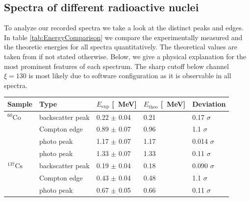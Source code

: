 \subsection{Spectra of different radioactive nuclei}
%
To analyze our recorded spectra we take a look at the distinct peaks and edges.
In table \ref{tab:EnergyComparison} we compare the experimentally measured and the theoretic energies for all spectra quantitatively.
The theoretical values are taken from \cite{Anleitung} if not stated otherwise.
Below, we give a physical explanation for the most prominent features of each spectrum.
The sharp cutoff below channel $\xi = 130$ is most likely due to software configuration as it is observable in all spectra.
%
\par
%
\minipage{\linewidth}
    \begin{center}
        \captionsetup{type=table}
        \begin{adjustbox}{max width=\linewidth, keepaspectratio}
            \begin{tabular}{lllll}
            \toprule
            Sample            & Type             & $E_{\text{exp}}$ [\SI{}{\mega\electronvolt}] & $E_{\text{theo}}$ [\SI{}{\mega\electronvolt}] & Deviation      \\
            \midrule
            $^{60}\text{Co}$  & backscatter peak & 0.22 $\pm$ 0.04                              & 0.21                                          & 0.17  $\sigma$ \\
            ~                 & Compton edge     & 0.89 $\pm$ 0.07                              & 0.96                                          & 1.1   $\sigma$ \\
            ~                 & photo peak       & 1.17 $\pm$ 0.07                              & 1.17                                          & 0.014 $\sigma$ \\
            ~                 & photo peak       & 1.33 $\pm$ 0.07                              & 1.33                                          & 0.11  $\sigma$ \\
            $^{137}\text{Cs}$ & backscatter peak & 0.19 $\pm$ 0.04                              & 0.18                                          & 0.090 $\sigma$ \\
            ~                 & Compton edge     & 0.43 $\pm$ 0.04                              & 0.48                                          & 1.1   $\sigma$ \\
            ~                 & photo peak       & 0.67 $\pm$ 0.05                              & 0.66                                          & 0.11  $\sigma$ \\

\end{tabular}
\end{adjustbox}
\end{center}
